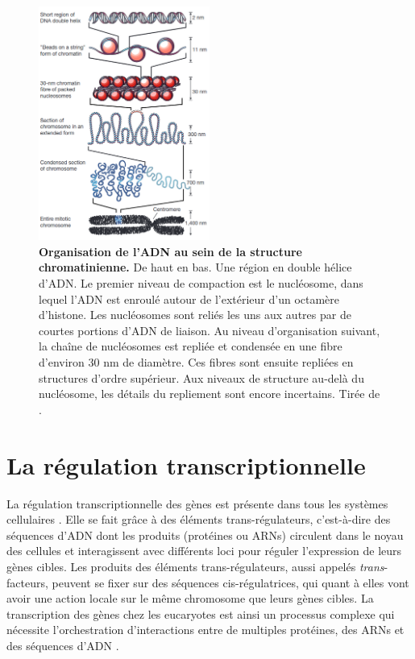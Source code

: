 \begin{figure}[h]
 \centering
 \includegraphics[width=0.5\textwidth, page=1] {figures/introduction/fig4.png}
 \caption[Organisation de l'\acrshort{ADN} au sein de la structure chromatinienne.]{
 \textbf{Organisation de l'\acrshort{ADN} au sein de la structure chromatinienne.}
 De haut en bas. Une région en double hélice d'\acrshort{ADN}. Le premier niveau de compaction est le nucléosome, dans lequel l'\acrshort{ADN} est enroulé autour de l'extérieur d'un octamère d'histone. Les nucléosomes sont reliés les uns aux autres par de courtes portions d'\acrshort{ADN} de liaison. Au niveau d'organisation suivant, la chaîne de nucléosomes est repliée et condensée en une fibre d'environ 30 nm de diamètre. Ces fibres sont ensuite repliées en structures d'ordre supérieur. Aux niveaux de structure au-delà du nucléosome, les détails du repliement sont encore incertains. Tirée de \citet{felsenfeld_controlling_2003}. \\
 }
 \label{fig:Fig4}
\end{figure} 

\section{La régulation transcriptionnelle}
\label{sec:reg-transcription}

La régulation transcriptionnelle des gènes est présente dans tous les systèmes cellulaires \citep{ptashne_regulation_2005}. Elle se fait grâce à des éléments \gls{trans}-régulateurs, c'est-à-dire des séquences d’ADN dont les produits (protéines ou \acrshort{ARN}s) circulent dans le noyau des cellules et interagissent avec différents loci pour réguler l’expression de leurs gènes cibles. Les produits des éléments \gls{trans}-régulateurs, aussi appelés \textit{trans}-facteurs, peuvent se fixer sur des séquences \gls{cis}-régulatrices, qui quant à elles vont avoir une action locale sur le même chromosome que leurs gènes cibles. La transcription des gènes chez les eucaryotes est ainsi un processus complexe qui nécessite l’orchestration d’interactions entre de multiples protéines, des \acrshort{ARN}s et des séquences d’ADN \citep{maston_transcriptional_2006,ong_enhancer_2011}.

